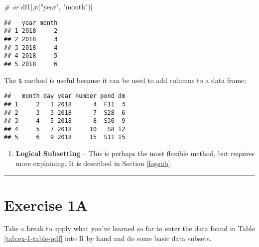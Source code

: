 \documentclass[]{book}
\newenvironment{Shaded}{\begin{snugshade}}{\end{snugshade}}
\newcommand{\CommentTok}[1]{\textcolor[rgb]{0.56,0.35,0.01}{\textit{#1}}}
\newcommand{\KeywordTok}[1]{\textcolor[rgb]{0.13,0.29,0.53}{\textbf{#1}}}
\newcommand{\NormalTok}[1]{#1}
\newcommand{\OperatorTok}[1]{\textcolor[rgb]{0.81,0.36,0.00}{\textbf{#1}}}
\newcommand{\StringTok}[1]{\textcolor[rgb]{0.31,0.60,0.02}{#1}}
\providecommand{\tightlist}{%
  \setlength{\itemsep}{0pt}\setlength{\parskip}{0pt}}
\begin{document}
\begin{Shaded}
\begin{Highlighting}[]
\CommentTok{# or}
\NormalTok{df1[,}\KeywordTok{c}\NormalTok{(}\StringTok{"year"}\NormalTok{, }\StringTok{"month"}\NormalTok{)]}
\end{Highlighting}
\end{Shaded}

\begin{verbatim}
##   year month
## 1 2018     2
## 2 2018     3
## 3 2018     4
## 4 2018     5
## 5 2018     6
\end{verbatim}

The \texttt{\$} method is useful because it can be used to add columns to a data frame:

\begin{Shaded}
\end{Shaded}

\begin{verbatim}
##   month day year number pond dm
## 1     2   1 2018      4  F11  3
## 2     3   3 2018      7  S28  6
## 3     4   5 2018      8  S30  9
## 4     5   7 2018     10   S8 12
## 5     6   9 2018     15  S11 15
\end{verbatim}

\begin{enumerate}
\def\labelenumi{\arabic{enumi}.}
\setcounter{enumi}{2}
\tightlist
\item
  \textbf{Logical Subsetting} -- This is perhaps the most flexible method, but requires more explaining. It is described in Section \ref{logsub}.
\end{enumerate}

\begin{center}\rule{0.5\linewidth}{\linethickness}\end{center}

\hypertarget{exercise-1a}{%
\section*{Exercise 1A}\label{exercise-1a}}

Take a break to apply what you've learned so far to enter the data found in Table \ref{tab:ex-1-table-pdf} into R by hand and do some basic data subsets.
\end{document}
